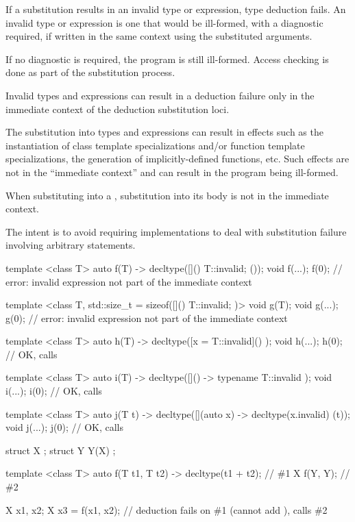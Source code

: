 \pnum
If a substitution results in an invalid type or expression, type deduction fails. An
invalid type or expression is one that would be ill-formed, with a diagnostic
required, if written in the same context using the substituted arguments.
\begin{note}
If no diagnostic is required, the program is still ill-formed.
Access checking is done as part of the substitution process.
\end{note}
Invalid types and expressions can result in a deduction failure
only in the immediate context of the deduction substitution loci.
\begin{note}
The substitution into types and expressions can result
in effects such as the instantiation of class template specializations and/or
function template specializations, the generation of implicitly-defined functions,
etc. Such effects are not in the ``immediate context'' and can result in the
program being ill-formed.
\end{note}

\pnum
When substituting into a ,
substitution into its body is not in the immediate context.
\begin{note}
The intent is to avoid requiring implementations to deal with
substitution failure involving arbitrary statements.
\begin{example}
\begin{codeblock}
template <class T>
  auto f(T) -> decltype([]() { T::invalid; } ());
void f(...);
f(0);               // error: invalid expression not part of the immediate context

template <class T, std::size_t = sizeof([]() { T::invalid; })>
  void g(T);
void g(...);
g(0);               // error: invalid expression not part of the immediate context

template <class T>
  auto h(T) -> decltype([x = T::invalid]() { });
void h(...);
h(0);               // OK, calls 

template <class T>
  auto i(T) -> decltype([]() -> typename T::invalid { });
void i(...);
i(0);               // OK, calls 

template <class T>
  auto j(T t) -> decltype([](auto x) -> decltype(x.invalid) { } (t));
void j(...);
j(0);               // OK, calls 
\end{codeblock}
\end{example}
\end{note}

\pnum
\begin{example}
\begin{codeblock}
struct X { };
struct Y {
  Y(X) {}
};

template <class T> auto f(T t1, T t2) -> decltype(t1 + t2);     // \#1
X f(Y, Y);                                                      // \#2

X x1, x2;
X x3 = f(x1, x2);   // deduction fails on \#1 (cannot add ), calls \#2
\end{codeblock}
\end{example}

